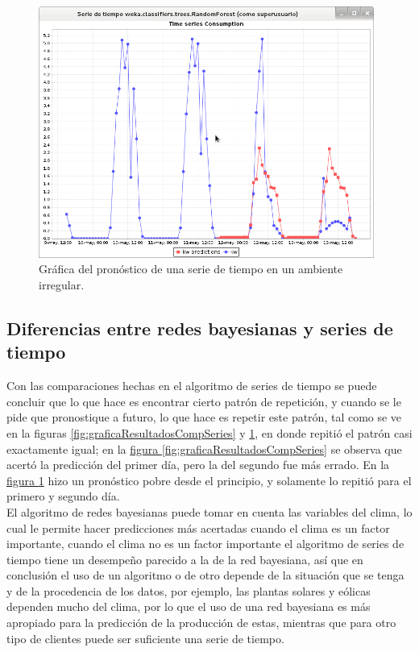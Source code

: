 \begin{figure}[!h]
	\centering
	\includegraphics[width=11cm]{img/graficaSerieIrregluar.png}
	\caption{Gráfica del pronóstico de una serie de tiempo en un ambiente irregular.}
	\label{fig:graficaSerieIrregluar}
\end{figure}

\subsection{Diferencias entre redes bayesianas y series de tiempo}
Con las comparaciones hechas en el algoritmo de series de tiempo se puede concluir que lo que hace es encontrar cierto patrón de repetición, y cuando se le pide que pronostique a futuro, lo que hace es repetir este patrón, tal como se ve en la figuras 
\ref{fig:graficaResultadosCompSeries} y \ref{fig:graficaSerieIrregluar}, en donde repitió el patrón casi exactamente igual; en la 
\hyperref[fig:graficaResultadosCompSeries]{ figura \ref{fig:graficaResultadosCompSeries}} se observa que acertó la predicción del primer día, pero la del segundo fue más errado. En la 
\hyperref[fig:graficaSerieIrregluar]{ figura \ref{fig:graficaSerieIrregluar}} hizo un pronóstico pobre desde el principio, y solamente lo repitió para el primero y segundo día.\\
El algoritmo de redes bayesianas puede tomar en cuenta las variables del clima, lo cual le permite hacer predicciones más acertadas cuando el clima es un factor importante, cuando el clima no es un factor importante el algoritmo de series de tiempo tiene un desempeño parecido a la de la red bayesiana, así que en conclusión el uso de un algoritmo o de otro depende de la situación que se tenga y de la procedencia de los datos, por ejemplo, las plantas solares y eólicas dependen mucho del clima, por lo que el uso de una red bayesiana es más apropiado para la predicción de la producción de estas, mientras que para otro tipo de clientes puede ser suficiente una serie de tiempo.

